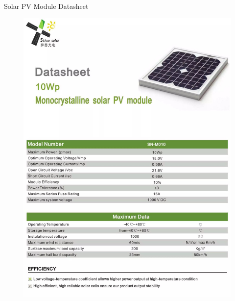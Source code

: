 \documentclass[a4paper,12pt]{article}
\begin{document}
\newpage
 Solar PV  Module Datasheet
\begin{figure}[!h]
\centering
\includegraphics[scale=0.4]{PV.jpg}\\
\end{figure}
\end{document}
